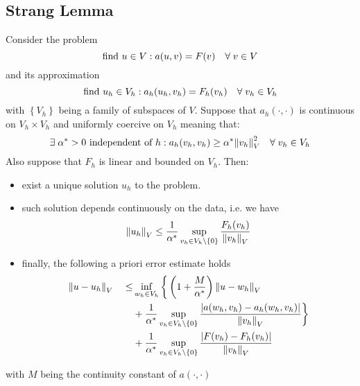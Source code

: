 \subsection{Strang Lemma}
\begin{lemma}
Consider the problem
\begin{equation}
    \text{find } u \in V: a(u,v) = F(v) \quad \forall \; v \in V
    \label{another_weak_formulation}
\end{equation}
and its approximation 
\begin{equation}
    \text{find } u_h \in V_h: a_h(u_h,v_h) = F_h(v_h) \quad \forall \; v_h \in V_h
    \label{another_weak_approximation}
\end{equation}
with \(\left\{V_h\right\}\) being a family of subspaces of \(V\). Suppose that \(a_h(\cdot,\cdot)\) is continuous on \(V_h \times V_h\) and uniformly coercive on \(V_h\) meaning that:
\[
    \exists \; \alpha^* > 0 \text{ independent of }h : a_h(v_h, v_h) \geq \alpha^* \norm{v_h}^2_V \quad \forall \; v_h \in V_h
\]
Also suppose that \(F_h\) is linear and bounded on \(V_h\). Then:
\begin{itemize}
    \item exist a unique solution \(u_h\) to the problem.
    \item such solution depends continuously on the data, i.e. we have 
    \[
        \norm{u_h}_V \leq \frac{1}{\alpha^*} \sup_{v_h \in V_h \backslash \left\{0\right\}} \frac{F_h(v_h)}{\norm{v_h}_V}
    \]
    \item  finally, the following a priori error estimate holds 
    \begin{align*}
        \norm{u-u_h}_V \quad \leq & \inf_{w_h \in V_h} \bigg\{\left(1+\frac{M}{\alpha^*}\right) \norm{u-w_h}_V \\
        &+ \frac{1}{\alpha^*} \sup_{v_h \in V_h \backslash \left\{0\right\}} \frac{\abs{a(w_h, v_h) - a_h(w_h, v_h)}}{\norm{v_h}_V} \bigg\} \\
        &+ \frac{1}{\alpha^*} \sup_{v_h \in V_h \backslash \left\{0\right\}} \frac{\abs{F(v_h)-F_h(v_h)}}{\norm{v_h}_V} 
    \end{align*}
\end{itemize}
with \(M\) being the continuity constant of \(a(\cdot, \cdot)\)
\end{lemma}

